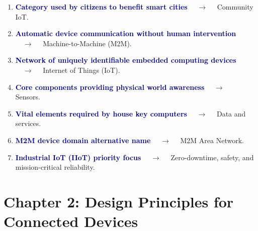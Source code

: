\documentclass[11pt,a4paper]{article}
\begin{document}
\begin{enumerate}[label=\arabic*., leftmargin=*, labelsep=0.8em, itemsep=0.35em, parsep=0.1em, topsep=0.2em]
  \item \textcolor{darkblue}{\textbf{Category used by citizens to benefit smart cities}} $\quad\to\quad$ Community IoT.
  \item \textcolor{darkblue}{\textbf{Automatic device communication without human intervention}} $\quad\to\quad$ Machine-to-Machine (M2M).
  \item \textcolor{darkblue}{\textbf{Network of uniquely identifiable embedded computing devices}} $\quad\to\quad$ Internet of Things (IoT).
  \item \textcolor{darkblue}{\textbf{Core components providing physical world awareness}} $\quad\to\quad$ Sensors.
  \item \textcolor{darkblue}{\textbf{Vital elements required by house key computers}} $\quad\to\quad$ Data and services.
  \item \textcolor{darkblue}{\textbf{M2M device domain alternative name}} $\quad\to\quad$ M2M Area Network.
  \item \textcolor{darkblue}{\textbf{Industrial IoT (IIoT) priority focus}} $\quad\to\quad$ Zero-downtime, safety, and mission-critical reliability.
\end{enumerate}

\section*{Chapter 2: Design Principles for Connected Devices}
\end{document}
